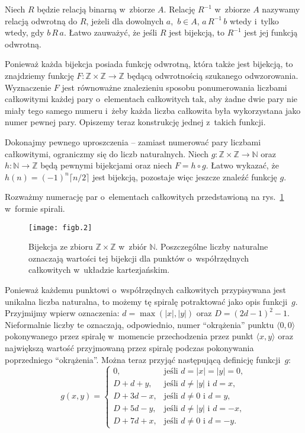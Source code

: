 \exercise %
Niech $R$ będzie relacją binarną w~zbiorze $A$. Relację $R^{-1}$ w~zbiorze $A$ nazywamy relacją odwrotną do $R$, jeżeli dla dowolnych $a$,~$b\in A$, $a\,R^{-1}\,b$ wtedy i~tylko wtedy, gdy $b\,R\,a$. Łatwo zauważyć, że jeśli $R$ jest bijekcją, to $R^{-1}$ jest jej funkcją odwrotną.

\exercise %
Ponieważ każda bijekcja posiada funkcję odwrotną, która także jest bijekcją, to znajdziemy funkcję $F\colon\mathbb{Z}\times\mathbb{Z}\to\mathbb{Z}$ będącą odwrotnością szukanego odwzorowania. Wyznaczenie $F$ jest równoważne znalezieniu sposobu ponumerowania liczbami całkowitymi każdej pary o~elementach całkowitych tak, aby żadne dwie pary nie miały tego samego numeru i~żeby każda liczba całkowita była wykorzystana jako numer pewnej pary. Opiszemy teraz konstrukcję jednej z~takich funkcji.

Dokonajmy pewnego uproszczenia -- zamiast numerować pary liczbami całkowitymi, ograniczmy się do liczb naturalnych. Niech $g\colon\mathbb{Z}\times\mathbb{Z}\to\mathbb{N}$ oraz $h\colon\mathbb{N}\to\mathbb{Z}$ będą pewnymi bijekcjami oraz niech $F=h\circ g$. Łatwo wykazać, że $h(n)=(-1)^n\lceil n/2\rceil$ jest bijekcją, pozostaje więc jeszcze znaleźć funkcję $g$.

Rozważmy numerację par o~elementach całkowitych przedstawioną na rys.~\ref{fig:B.3-4} w~formie spirali.
\begin{figure}[ht]
	\begin{center}
		\texttt{[image: figb.2]}
	\end{center}
	\caption{Bijekcja ze zbioru $\mathbb{Z}\times\mathbb{Z}$ w~zbiór $\mathbb{N}$. Poszczególne liczby naturalne oznaczają wartości tej bijekcji dla punktów o~współrzędnych całkowitych w~układzie kartezjańskim.} \label{fig:B.3-4}
\end{figure}
Ponieważ każdemu punktowi o~współrzędnych całkowitych przypisywana jest unikalna liczba naturalna, to możemy tę spiralę potraktować jako opis funkcji~$g$. Przyjmijmy wpierw oznaczenia: $d=\max(|x|,|y|)$ oraz $D=(2d-1)^2-1$. Nieformalnie liczby te oznaczają, odpowiednio, numer ``okrążenia'' punktu $\langle0,0\rangle$ pokonywanego przez spiralę w~momencie przechodzenia przez punkt $\langle x,y\rangle$ oraz największą wartość przyjmowaną przez spiralę podczas pokonywania poprzedniego ``okrążenia''. Można teraz przyjąć następującą definicję funkcji~$g$:
\[
	g(x,y) =
	\begin{cases}
		0, & \text{jeśli $d=|x|=|y|=0$}, \\
		D+d+y, & \text{jeśli $d\ne|y|$ i~$d=x$}, \\
		D+3d-x, & \text{jeśli $d\ne0$ i~$d=y$}, \\
		D+5d-y, & \text{jeśli $d\ne|y|$ i~$d=-x$}, \\
		D+7d+x, & \text{jeśli $d\ne0$ i~$d=-y$}.
	\end{cases}
\]

